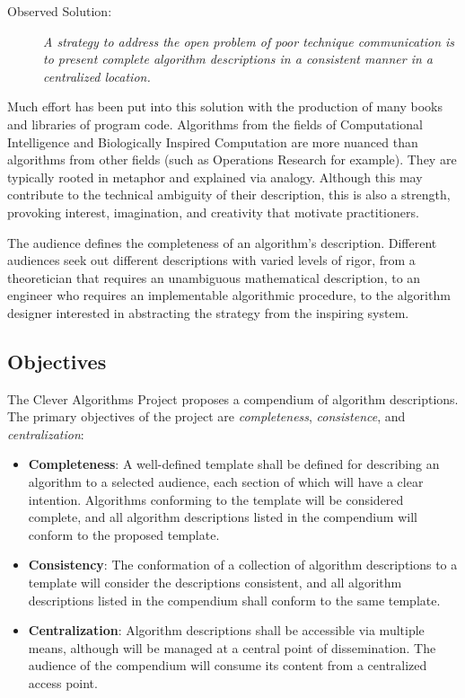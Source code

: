 \documentclass[a4paper, 11pt]{article}
\begin{document}
\begin{description}
	\item[Observed Solution:]\emph{A strategy to address the open problem of poor technique communication is to present complete algorithm descriptions in a consistent manner in a centralized location.} 
\end{description}

Much effort has been put into this solution with the production of many books and libraries of program code. Algorithms from the fields of Computational Intelligence and Biologically Inspired Computation are more nuanced than algorithms from other fields (such as Operations Research for example). They are typically rooted in metaphor and explained via analogy. Although this may contribute to the technical ambiguity of their description, this is also a strength, provoking  interest, imagination, and creativity that motivate practitioners. 

The audience defines the completeness of an algorithm's description. Different audiences seek out different descriptions with varied levels of rigor, from a theoretician that requires an unambiguous mathematical description, to an engineer who requires an implementable algorithmic procedure, to the algorithm designer interested in abstracting the strategy from the inspiring system. 

\subsection{Objectives}
The Clever Algorithms Project proposes a compendium of algorithm descriptions. The primary objectives of the project are \emph{completeness}, \emph{consistence}, and \emph{centralization}:

\begin{itemize}
	\item \textbf{Completeness}: A well-defined template shall be defined for describing an algorithm to a selected audience, each section of which will have a clear intention. Algorithms conforming to the template will be considered complete, and all algorithm descriptions listed in the compendium will conform to the proposed template.
	\item \textbf{Consistency}: The conformation of a collection of algorithm descriptions to a template will consider the descriptions consistent, and all algorithm descriptions listed in the compendium shall conform to the same template.
	\item \textbf{Centralization}: Algorithm descriptions shall be accessible via multiple means, although will be managed at a central point of dissemination. The audience of the compendium will consume its content from a centralized access point.
\end{itemize}
\end{document}
